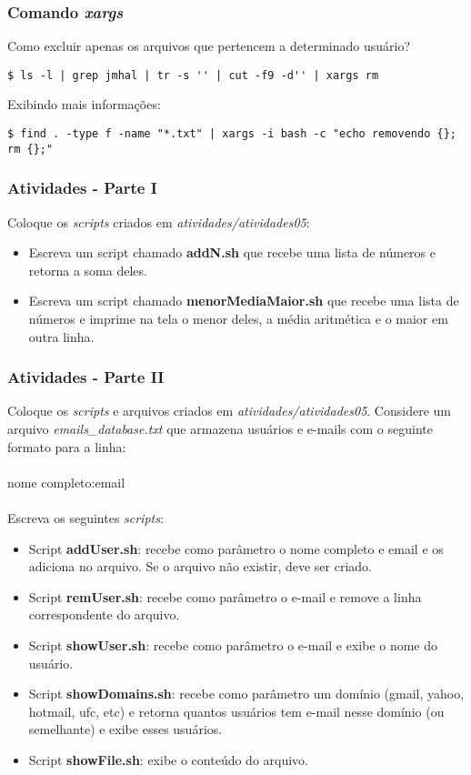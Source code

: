 \documentclass{beamer}
\begin{document}
\begin{frame}[fragile]
   \frametitle{Comando \textit{xargs}}
   Como excluir apenas os arquivos que pertencem a determinado usuário? 
   \small
   \begin{verbatim}
$ ls -l | grep jmhal | tr -s '' | cut -f9 -d'' | xargs rm  
   \end{verbatim}
   \normalsize
   Exibindo mais informações:
   \scriptsize
   \begin{verbatim}
$ find . -type f -name "*.txt" | xargs -i bash -c "echo removendo {}; rm {};" 
   \end{verbatim}
\end{frame}

   \begin{frame}
      \frametitle{Atividades -  Parte I}
      Coloque os \textit{scripts} criados em \textit{atividades/atividades05}:
      \begin{itemize}
         \item Escreva um script chamado \textbf{addN.sh} que recebe uma lista de números e retorna a soma deles.
	 \item Escreva um script chamado \textbf{menorMediaMaior.sh} que recebe uma lista de números e imprime na tela o menor deles, a média aritmética e o maior em outra linha. 
      \end{itemize}
   \end{frame}

   \begin{frame}
      \frametitle{Atividades - Parte II}
      \scriptsize
      Coloque os \textit{scripts} e arquivos criados em \textit{atividades/atividades05}. Considere um arquivo \textit{emails\_database.txt} que armazena usuários e e-mails com o seguinte formato para a linha: \\
      \\
      nome completo:email \\ \\
      Escreva os seguintes \textit{scripts}:
      \begin{itemize}
         \item Script \textbf{addUser.sh}: recebe como parâmetro o nome completo e email e os adiciona no arquivo. Se o arquivo não existir, deve ser criado.
	 \item Script \textbf{remUser.sh}: recebe como parâmetro o e-mail e remove a linha correspondente do arquivo.
	 \item Script \textbf{showUser.sh}: recebe como parâmetro o e-mail e exibe o nome do usuário.
	 \item Script \textbf{showDomains.sh}: recebe como parâmetro um domínio (gmail, yahoo, hotmail, ufc, etc) e retorna quantos usuários tem e-mail nesse domínio (ou semelhante) e exibe esses usuários.
	 \item Script \textbf{showFile.sh}: exibe o conteúdo do arquivo.
      \end{itemize}
   \end{frame}
\end{document}
